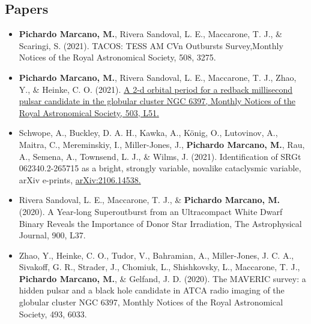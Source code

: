 \documentclass[letterpaper,10pt]{article}
\begin{document}
\subsection*{Papers}
\begin{itemize}[label=$\blacktriangleright$]

\subsubsection*{Refereed}



        
        \item \textbf{Pichardo Marcano, M.}, Rivera Sandoval, L. E., Maccarone, T. J., \& Scaringi, S. (2021). TACOS: TESS AM CVn Outbursts Survey,Monthly Notices of the Royal Astronomical Society, 508, 3275.


        
                
            \item \textbf{Pichardo Marcano, M.}, Rivera Sandoval, L. E., Maccarone, T. J., Zhao, Y., \& Heinke, C. O. (2021). \href{https://ui.adsabs.harvard.edu/abs/2021MNRAS.503L..51P/abstract}{A 2-d orbital period for a redback millisecond pulsar candidate in the globular cluster NGC 6397, Monthly Notices of the Royal Astronomical Society, 503, L51.}
        
        
        \item Schwope, A., Buckley, D. A. H., Kawka, A., K\"onig, O., Lutovinov, A., Maitra, C., Mereminskiy, I., Miller-Jones, J., \textbf{Pichardo Marcano, M.}, Rau, A., Semena, A., Townsend, L. J., \& Wilms, J. (2021). Identification of SRGt 062340.2-265715 as a bright, strongly variable, novalike cataclysmic variable, arXiv e-prints, \href{https://ui.adsabs.harvard.edu/abs/2021arXiv210614538S/abstract}{arXiv:2106.14538.}





        
        
    \item Rivera Sandoval, L. E., Maccarone, T. J., \& \textbf{Pichardo Marcano, M.} (2020). A Year-long Superoutburst from an Ultracompact White Dwarf Binary Reveals the Importance of Donor Star Irradiation, The Astrophysical Journal, 900, L37. \\

    \item Zhao, Y., Heinke, C. O., Tudor, V., Bahramian, A., Miller-Jones, J. C. A., Sivakoff, G. R., Strader, J., Chomiuk, L., Shishkovsky, L., Maccarone, T. J., \textbf{Pichardo Marcano, M.}, \& Gelfand, J. D. (2020). The MAVERIC survey: a hidden pulsar and a black hole candidate in ATCA radio imaging of the globular cluster NGC 6397, Monthly Notices of the Royal Astronomical Society, 493, 6033. \href{10.1093/mnras/staa631} \\



\end{itemize}
\end{document}
